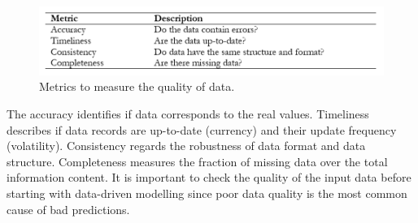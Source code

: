 \begin{figure}[hbt!]
\centering
\includegraphics[width=1\textwidth]{SectionIntroduction/introduction_figures/tab_dataQuality.png}
\captionsetup{type=table}
\caption{Metrics to measure the quality of data.}
\label{tab_dataQuality}
\end{figure}

The accuracy identifies if data corresponds to the real values. Timeliness describes if data records are up-to-date (currency) and their update frequency (volatility). Consistency regards the robustness of data format and data structure. Completeness measures the fraction of missing data over the total information content. It is important to check the quality of the input data before starting with data-driven modelling since poor data quality is the most common cause of bad predictions.







